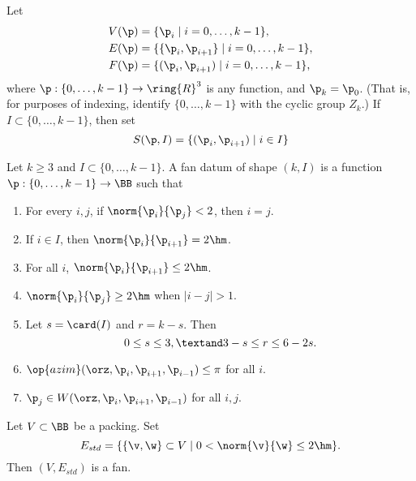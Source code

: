 Let 
\begin{align*}
V(\p) &= \{\p_{i}\mid i=0,\ldots,k-1\},\\
E(\p) &= \{\{\p_{i},\p_{i+1}\}\mid i=0,\ldots,k-1\},\\
F(\p) &= \{(\p_{i},\p_{i+1}) \mid i=0,\ldots,k-1\},\\
\end{align*}
where $\p:\{0,\ldots,k-1\}\to \ring{R}^3$ is any function, and $\p_k =
\p_0$.  (That is, for purposes of indexing, identify
$\{0,\ldots,k-1\}$ with the cyclic group $Z_k$.)  If
$I\subset\{0,\ldots,k-1\}$, then set
\[ S(\p,I) = \{(\p_i ,\p_{i+1}) \mid i\in
I\}\] 

\begin{definition}
 Let $k\ge3$ and $I\subset
\{0,\ldots,k-1\}$.  A fan datum of shape $(k,I)$ is a function
$\p:\{0,\ldots,k-1\}\to \BB$ such that
\begin{enumerate}\wasitemize 
\item {} For every $i,j$, if $\norm{\p_i}{\p_j}<2$, then
$i=j$.
\item {} If $i\in I$, then $\norm{\p_i}{\p_{i+1}}=2\hm$.
\item {} For all $i$, $\norm{\p_i}{\p_{i+1}} \le 2\hm$.
\item {}  $\norm{\p_i}{\p_j} \ge 2\hm$ when $|i-j|>1$.
\item {}  Let $s=\card(I)$ and $r=k-s$.  Then 
\[ 0\le s \le 3,\textand 3-s \le r \le 6
- 2s.\] 
\item {} $\op{azim}(\orz,\p_i,\p_{i+1},\p_{i-1})\le \pi$ for
all $i$.
\item {} $\p_j\in W(\orz,\p_i,\p_{i+1},\p_{i-1})$ for all $i,j$.
\end{enumerate}\wasitemize 
\end{definition}


\begin{lemma}\label{lemma:std-fan} 
Let $V\subset \BB$ be a packing.  Set 
\[ E_{std} = \{\{\v,\w\}\subset V\mid 0 <
\norm{\v}{\w} \le 2\hm\}.\]  Then $(V,E_{std})$ is a fan.
\end{lemma}
%

